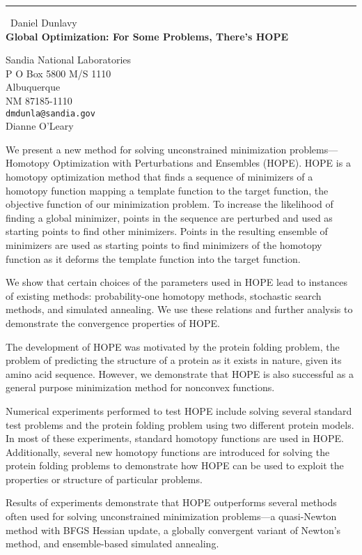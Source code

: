 \documentclass{report}
\begin{document}
\begin{center}
\rule{6in}{1pt} \
{\large Daniel Dunlavy \\
{\bf Global Optimization: For Some Problems, There's HOPE}}

Sandia National Laboratories \\ P O Box 5800 M/S 1110 \\ Albuquerque \\ NM 87185-1110
\\
{\tt dmdunla@sandia.gov}\\
Dianne O'Leary\end{center}

We present a new method for solving unconstrained minimization
problems---Homotopy Optimization with Perturbations and Ensembles (HOPE).
HOPE is a homotopy optimization method that finds a sequence of
minimizers of a homotopy function mapping a template function to the
target function, the objective function of our minimization problem. To
increase the likelihood of finding a global minimizer, points in the
sequence are perturbed and used as starting points to find other
minimizers. Points in the resulting ensemble of minimizers are used as
starting points to find minimizers of the homotopy function as it deforms
the template function into the target function.

We show that certain choices of the parameters used in HOPE lead to
instances of existing methods: probability-one homotopy methods,
stochastic search methods, and simulated annealing. We use these
relations and further analysis to demonstrate the convergence properties
of HOPE.

The development of HOPE was motivated by the protein folding problem, the
problem of predicting the structure of a protein as it exists in nature,
given its amino acid sequence. However, we demonstrate that HOPE is also
successful as a general purpose minimization method for nonconvex
functions.

Numerical experiments performed to test HOPE include solving several
standard test problems and the protein folding problem using two
different protein models. In most of these experiments, standard homotopy
functions are used in HOPE. Additionally, several new homotopy functions
are introduced for solving the protein folding problems to demonstrate
how HOPE can be used to exploit the properties or structure of particular
problems.

Results of experiments demonstrate that HOPE outperforms several
methods often used for solving unconstrained minimization problems---a
quasi-Newton method with BFGS Hessian update, a globally convergent
variant of Newton's method, and ensemble-based simulated annealing.
\end{document}
